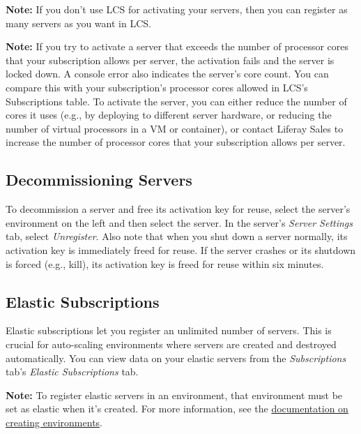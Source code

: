 \noindent\hrulefill

\textbf{Note:} If you don't use LCS for activating your servers, then
you can register as many servers as you want in LCS.

\noindent\hrulefill

\noindent\hrulefill

\textbf{Note:} If you try to activate a server that exceeds the number
of processor cores that your subscription allows per server, the
activation fails and the server is locked down. A console error also
indicates the server's core count. You can compare this with your
subscription's processor cores allowed in LCS's Subscriptions table. To
activate the server, you can either reduce the number of cores it uses
(e.g., by deploying to different server hardware, or reducing the number
of virtual processors in a VM or container), or contact Liferay Sales to
increase the number of processor cores that your subscription allows per
server.

\noindent\hrulefill

\subsection{Decommissioning Servers}\label{decommissioning-servers}

To decommission a server and free its activation key for reuse, select
the server's environment on the left and then select the server. In the
server's \emph{Server Settings} tab, select \emph{Unregister}. Also note
that when you shut down a server normally, its activation key is
immediately freed for reuse. If the server crashes or its shutdown is
forced (e.g., kill), its activation key is freed for reuse within six
minutes.

\subsection{Elastic Subscriptions}\label{elastic-subscriptions}

Elastic subscriptions let you register an unlimited number of servers.
This is crucial for auto-scaling environments where servers are created
and destroyed automatically. You can view data on your elastic servers
from the \emph{Subscriptions} tab's \emph{Elastic Subscriptions} tab.

\noindent\hrulefill

\textbf{Note:} To register elastic servers in an environment, that
environment must be set as elastic when it's created. For more
information, see the \hyperref[creating-an-environment]{documentation on
creating environments}.

